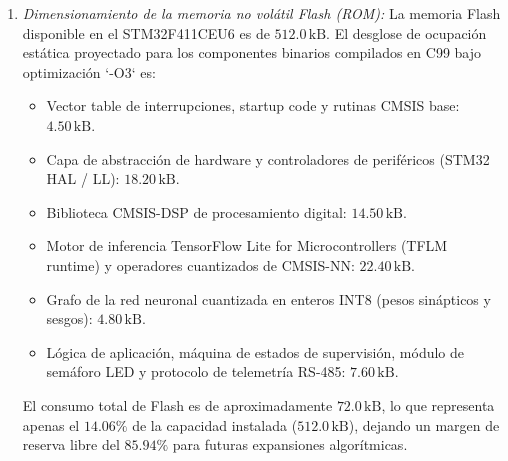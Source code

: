 \begin{enumerate}
    \item \textit{Dimensionamiento de la memoria no volátil Flash (ROM):} La memoria Flash disponible en el STM32F411CEU6 es de $512.0\,\text{kB}$. El desglose de ocupación estática proyectado para los componentes binarios compilados en C99 bajo optimización `-O3` es:
    \begin{itemize}
        \item Vector table de interrupciones, startup code y rutinas CMSIS base: $4.50\,\text{kB}$.
        \item Capa de abstracción de hardware y controladores de periféricos (STM32 HAL / LL): $18.20\,\text{kB}$.
        \item Biblioteca CMSIS-DSP de procesamiento digital: $14.50\,\text{kB}$.
        \item Motor de inferencia TensorFlow Lite for Microcontrollers (TFLM runtime) y operadores cuantizados de CMSIS-NN: $22.40\,\text{kB}$.
        \item Grafo de la red neuronal cuantizada en enteros INT8 (pesos sinápticos y sesgos): $4.80\,\text{kB}$.
        \item Lógica de aplicación, máquina de estados de supervisión, módulo de semáforo LED y protocolo de telemetría RS-485: $7.60\,\text{kB}$.
    \end{itemize}
    El consumo total de Flash es de aproximadamente $72.0\,\text{kB}$, lo que representa apenas el $14.06\%$ de la capacidad instalada ($512.0\,\text{kB}$), dejando un margen de reserva libre del $85.94\%$ para futuras expansiones algorítmicas.


\end{enumerate}

